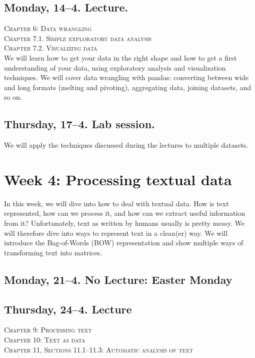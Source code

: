 \subsection*{Monday, 14--4. Lecture.}
\textsc{ Chapter 6: Data wrangling}\\
\textsc{ Chapter 7.1. Simple exploratory data analysis}\\
\textsc{ Chapter 7.2. Visualizing data}\\

We will learn how to get your data in the right shape and how to get a first understanding of your data, using exploratory analysis and visualization techniques. We will cover data wrangling with pandas: converting between wide and long formats (melting and pivoting), aggregating data, joining datasets, and so on.

\subsection*{Thursday, 17--4. Lab session.}
We will apply the techniques discussed during the lectures to multiple datasets.


\section*{Week 4: Processing textual data}
In this week, we will dive into how to deal with textual data. How is text represented, how can we process it, and how can we extract useful information from it?
Unfortunately, text as written by humans usually is pretty messy.  We will therefore dive  into ways to represent text in a clean(er) way. We will introduce the Bag-of-Words (BOW) representation and show multiple ways of transforming text into matrices.

\subsection*{Monday, 21--4. No Lecture: Easter Monday}
\subsection*{Thursday, 24--4. Lecture}

\textsc{ Chapter 9: Processing text}\\
\textsc{ Chapter 10: Text as data}\\
\textsc{ Chapter 11, Sections 11.1--11.3: Automatic analysis of text}\\

